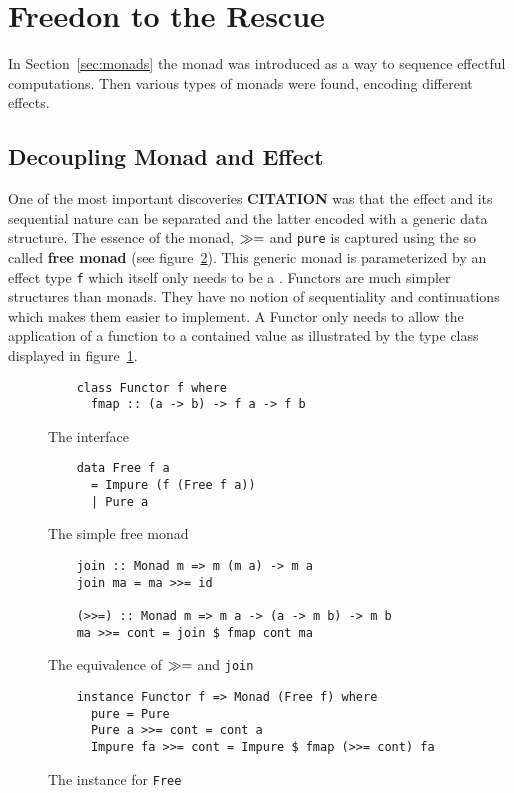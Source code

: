 \section{Freedon to the Rescue}

\label{sec:free}

In Section~\ref{sec:monads} the monad was introduced as a way to
sequence effectful computations. Then various types of monads were
found, encoding different effects.

\subsection{Decoupling Monad and Effect}

\label{sec:introducing-free}

One of the most important discoveries \textbf{CITATION} was that the
effect and its sequential nature can be separated and the latter
encoded with a generic data structure. The essence of the monad,
$\gg=$ and \texttt{pure} is captured using the so called
\textbf{free monad} (see figure~\ref{fig:free-monad}). This generic
monad is parameterized by an effect type \texttt{f} which itself only
needs to be a \Functor{}. Functors are much simpler structures than
monads. They have no notion of sequentiality and continuations which
makes them easier to implement. A Functor only needs to allow the
application of a function to a contained value as illustrated by the
type class \Functor{} displayed in figure~\ref{fig:functor-class}.

\begin{figure}
  \begin{lstlisting}
    class Functor f where
      fmap :: (a -> b) -> f a -> f b
  \end{lstlisting}
  \caption{The \Functor{} interface}
  \label{fig:functor-class}
\end{figure}
\begin{figure}
  \begin{lstlisting}
    data Free f a
      = Impure (f (Free f a))
      | Pure a
  \end{lstlisting}
  \caption{The simple free monad}
  \label{fig:free-monad}
\end{figure}
\begin{figure}
  \begin{lstlisting}
    join :: Monad m => m (m a) -> m a
    join ma = ma >>= id

    (>>=) :: Monad m => m a -> (a -> m b) -> m b
    ma >>= cont = join $ fmap cont ma
  \end{lstlisting}
  \caption{The equivalence of $\gg=$ and \texttt{join}}
  \label{fig:join-bind-equivalence}
\end{figure}
\begin{figure}
  \begin{lstlisting}
    instance Functor f => Monad (Free f) where
      pure = Pure
      Pure a >>= cont = cont a
      Impure fa >>= cont = Impure $ fmap (>>= cont) fa
  \end{lstlisting}
  \caption{The \Monad{} instance for \texttt{Free}}
  \label{fig:free-monad-monad-instance}
\end{figure}

